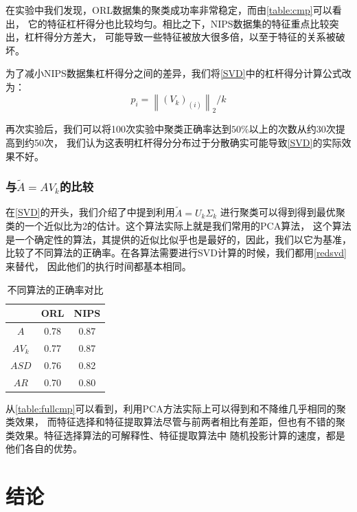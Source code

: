 \documentclass{ctexart}
\begin{document}
    在实验中我们发现，ORL数据集的聚类成功率非常稳定，而由\autoref{table:cmp}可以看出， 
    它的特征杠杆得分也比较均匀。相比之下，NIPS数据集的特征重点比较突出，杠杆得分方差大，
    可能导致一些特征被放大很多倍，以至于特征的关系被破坏。

    为了减小NIPS数据集杠杆得分之间的差异，我们将\autoref{SVD}中的杠杆得分计算公式改为：
    $$
    p_{i}=\left\|\left(V_{k}\right)_{(i)}\right\|_{2} / k
    $$

    再次实验后，我们可以将100次实验中聚类正确率达到$50\%$以上的次数从约30次提高到约50次，
    我们认为这表明杠杆得分分布过于分散确实可能导致\autoref{SVD}的实际效果不好。

    \subsubsection{与$\tilde{A}=A V_k$的比较}
    \label{sec:cmppca}
    在\autoref{SVD}的开头，我们介绍了\cite{drineas1999clustering}中提到利用$\tilde{A}=U_k \Sigma_k$
    进行聚类可以得到得到最优聚类的一个近似比为2的估计。这个算法实际上就是我们常用的PCA算法，
    这个算法是一个确定性的算法，其提供的近似比似乎也是最好的，因此，我们以它为基准，
    比较了不同算法的正确率。在各算法需要进行SVD计算的时候，我们都用\autoref{redsvd}来替代，
    因此他们的执行时间都基本相同。

    \begin{table}[h]
        \centering
        \begin{tabular}{|c|c|c|}
            \hline
            & ORL & NIPS \\ \hline
            $A$ & 0.78 & 0.87 \\ \hline
            $AV_k$ & 0.77 & 0.87 \\ \hline
            $ASD$ & 0.76 & 0.82 \\ \hline 
            $AR$ & 0.70 & 0.80 \\ \hline
        \end{tabular}
        \caption{不同算法的正确率对比}
        \label{table:fullcmp}
    \end{table}

    从\autoref{table:fullcmp}可以看到，利用PCA方法实际上可以得到和不降维几乎相同的聚类效果，
    而特征选择和特征提取算法尽管与前两者相比有差距，但也有不错的聚类效果。特征选择算法的可解释性、特征提取算法中
    随机投影计算的速度，都是他们各自的优势。

    \section{结论}

\nocite{*} %


\end{document}
